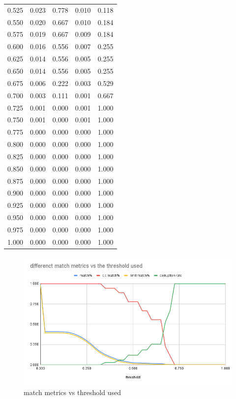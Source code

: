 \documentclass{article}
\begin{document}
\begin{table}[]
\begin{tabular}{
  >{\columncolor[HTML]{FFE599}}c 
  >{\columncolor[HTML]{B6D7A8}}c 
  >{\columncolor[HTML]{9FC5E8}}c 
  >{\columncolor[HTML]{F9CB9C}}c 
  >{\columncolor[HTML]{D9D2E9}}c }
  0.525 & 0.023 & 0.778 & 0.010 & 0.118 \\
  0.550 & 0.020 & 0.667 & 0.010 & 0.184 \\
  0.575 & 0.019 & 0.667 & 0.009 & 0.184 \\
  0.600 & 0.016 & 0.556 & 0.007 & 0.255 \\
  0.625 & 0.014 & 0.556 & 0.005 & 0.255 \\
  0.650 & 0.014 & 0.556 & 0.005 & 0.255 \\
  0.675 & 0.006 & 0.222 & 0.003 & 0.529 \\
  0.700 & 0.003 & 0.111 & 0.001 & 0.667 \\
  0.725 & 0.001 & 0.000 & 0.001 & 1.000 \\
  0.750 & 0.001 & 0.000 & 0.001 & 1.000 \\
  0.775 & 0.000 & 0.000 & 0.000 & 1.000 \\
  0.800 & 0.000 & 0.000 & 0.000 & 1.000 \\
  0.825 & 0.000 & 0.000 & 0.000 & 1.000 \\
  0.850 & 0.000 & 0.000 & 0.000 & 1.000 \\
  0.875 & 0.000 & 0.000 & 0.000 & 1.000 \\
  0.900 & 0.000 & 0.000 & 0.000 & 1.000 \\
  0.925 & 0.000 & 0.000 & 0.000 & 1.000 \\
  0.950 & 0.000 & 0.000 & 0.000 & 1.000 \\
  0.975 & 0.000 & 0.000 & 0.000 & 1.000 \\
  1.000 & 0.000 & 0.000 & 0.000 & 1.000
  \end{tabular}
  \end{table}


\begin{figure}[h]
    \caption{match metrics vs threshold used}\label{fig:match_metrics_vs_threshold_used}
    \centering
    \includegraphics[height=0.5\textwidth]{pictures/match_metrics_vs_threshold_used.png}
\end{figure}
\end{document}
